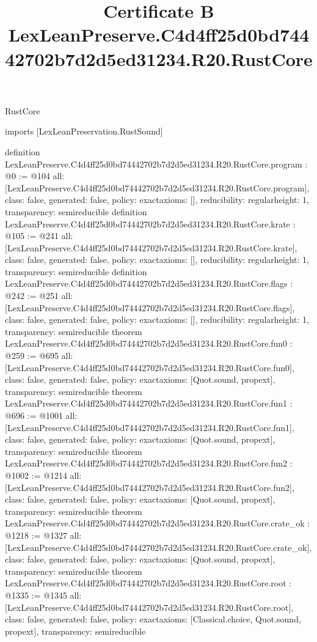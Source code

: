 \begin{lexlean}{RustCore}
\title{Certificate B LexLeanPreserve.C4d4ff25d0bd74442702b7d2d5ed31234.R20.RustCore}
\begin{coremodule}
imports [LexLeanPreservation.RustSound]

definition LexLeanPreserve.C4d4ff25d0bd74442702b7d2d5ed31234.R20.RustCore.program : @0 := @104 {
  all: [LexLeanPreserve.C4d4ff25d0bd74442702b7d2d5ed31234.R20.RustCore.program],
  class: false,
  generated: false,
  policy: exact{axioms: []},
  reducibility: regular{height: 1},
  transparency: semireducible
}
definition LexLeanPreserve.C4d4ff25d0bd74442702b7d2d5ed31234.R20.RustCore.krate : @105 := @241 {
  all: [LexLeanPreserve.C4d4ff25d0bd74442702b7d2d5ed31234.R20.RustCore.krate],
  class: false,
  generated: false,
  policy: exact{axioms: []},
  reducibility: regular{height: 1},
  transparency: semireducible
}
definition LexLeanPreserve.C4d4ff25d0bd74442702b7d2d5ed31234.R20.RustCore.flags : @242 := @251 {
  all: [LexLeanPreserve.C4d4ff25d0bd74442702b7d2d5ed31234.R20.RustCore.flags],
  class: false,
  generated: false,
  policy: exact{axioms: []},
  reducibility: regular{height: 1},
  transparency: semireducible
}
theorem LexLeanPreserve.C4d4ff25d0bd74442702b7d2d5ed31234.R20.RustCore.fun0 : @259 := @695 {
  all: [LexLeanPreserve.C4d4ff25d0bd74442702b7d2d5ed31234.R20.RustCore.fun0],
  class: false,
  generated: false,
  policy: exact{axioms: [Quot.sound, propext]},
  transparency: semireducible
}
theorem LexLeanPreserve.C4d4ff25d0bd74442702b7d2d5ed31234.R20.RustCore.fun1 : @696 := @1001 {
  all: [LexLeanPreserve.C4d4ff25d0bd74442702b7d2d5ed31234.R20.RustCore.fun1],
  class: false,
  generated: false,
  policy: exact{axioms: [Quot.sound, propext]},
  transparency: semireducible
}
theorem LexLeanPreserve.C4d4ff25d0bd74442702b7d2d5ed31234.R20.RustCore.fun2 : @1002 := @1214 {
  all: [LexLeanPreserve.C4d4ff25d0bd74442702b7d2d5ed31234.R20.RustCore.fun2],
  class: false,
  generated: false,
  policy: exact{axioms: [Quot.sound, propext]},
  transparency: semireducible
}
theorem LexLeanPreserve.C4d4ff25d0bd74442702b7d2d5ed31234.R20.RustCore.crate_ok : @1218 := @1327 {
  all: [LexLeanPreserve.C4d4ff25d0bd74442702b7d2d5ed31234.R20.RustCore.crate_ok],
  class: false,
  generated: false,
  policy: exact{axioms: [Quot.sound, propext]},
  transparency: semireducible
}
theorem LexLeanPreserve.C4d4ff25d0bd74442702b7d2d5ed31234.R20.RustCore.root : @1335 := @1345 {
  all: [LexLeanPreserve.C4d4ff25d0bd74442702b7d2d5ed31234.R20.RustCore.root],
  class: false,
  generated: false,
  policy: exact{axioms: [Classical.choice, Quot.sound, propext]},
  transparency: semireducible
}


\end{coremodule}
\end{lexlean}
